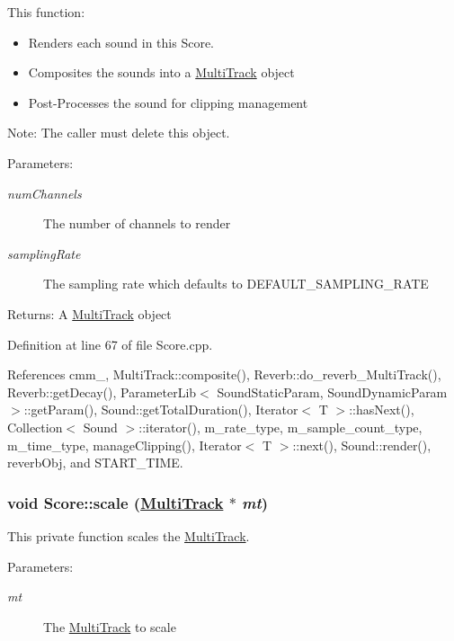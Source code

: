This function:\begin{itemize}
\item Renders each sound in this Score.\item Composites the sounds into a \hyperlink{classMultiTrack}{Multi\-Track} object\item Post-Processes the sound for clipping management\end{itemize}


\begin{Desc}
\item[Note:]The caller must delete this object. \end{Desc}
\begin{Desc}
\item[Parameters:]
\begin{description}
\item[{\em num\-Channels}]The number of channels to render \item[{\em sampling\-Rate}]The sampling rate which defaults to DEFAULT\_\-SAMPLING\_\-RATE \end{description}
\end{Desc}
\begin{Desc}
\item[Returns:]A \hyperlink{classMultiTrack}{Multi\-Track} object \end{Desc}


Definition at line 67 of file Score.cpp.

References cmm\_\-, Multi\-Track::composite(), Reverb::do\_\-reverb\_\-Multi\-Track(), Reverb::get\-Decay(), Parameter\-Lib$<$ Sound\-Static\-Param, Sound\-Dynamic\-Param $>$::get\-Param(), Sound::get\-Total\-Duration(), Iterator$<$ T $>$::has\-Next(), Collection$<$ Sound $>$::iterator(), m\_\-rate\_\-type, m\_\-sample\_\-count\_\-type, m\_\-time\_\-type, manage\-Clipping(), Iterator$<$ T $>$::next(), Sound::render(), reverb\-Obj, and START\_\-TIME.\hypertarget{classScore_h1}{
\subsubsection[scale]{\setlength{\rightskip}{0pt plus 5cm}void Score::scale (\hyperlink{classMultiTrack}{Multi\-Track} $\ast$ {\em mt})}}
\label{classScore_h1}


This private function scales the \hyperlink{classMultiTrack}{Multi\-Track}. \begin{Desc}
\item[Parameters:]
\begin{description}
\item[{\em mt}]The \hyperlink{classMultiTrack}{Multi\-Track} to scale \end{description}
\end{Desc}


